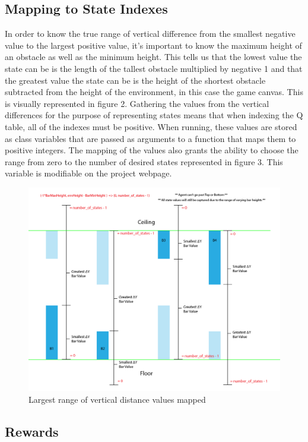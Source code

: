 \documentclass{article}
\begin{document}
\subsection{Mapping to State Indexes}


In order to know the true range of vertical difference from the smallest negative value to the largest positive value, it's important to know the maximum height of an obstacle as well as the minimum height. This tells us that the lowest value the state can be is the length of the tallest obstacle multiplied by negative 1 and that the greatest value the state can be is the height of the shortest obstacle subtracted from the height of the environment, in this case the game canvas. This is visually represented in figure 2. Gathering the values from the vertical differences for the purpose of representing states means that when indexing the Q table, all of the indexes must be positive. When running, these values are stored as class variables that are passed as arguments to a function that maps them to positive integers. The mapping of the values also grants the ability to choose the range from zero to the number of desired states represented in figure 3. This variable is modifiable on the project webpage. 

\begin{figure}[h!]
    \centering
    \includegraphics[width=1\textwidth]{figure3}
    \caption{Largest range of vertical distance values mapped}
    \label{fig:mesh2}
\end{figure}

\subsection{Rewards}
\end{document}
